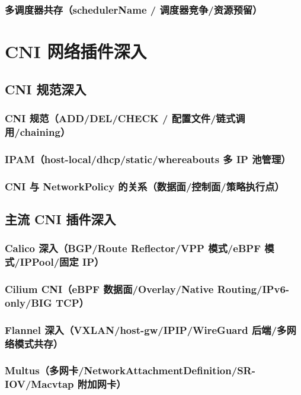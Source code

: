 \documentclass[12pt,UTF8]{ctexbook}
\begin{document}
    \subsection{多调度器共存（schedulerName / 调度器竞争/资源预留）}


\chapter{CNI 网络插件深入}
\label{chap:cni-deep}

  \section{CNI 规范深入}
    \subsection{CNI 规范（ADD/DEL/CHECK / 配置文件/链式调用/chaining）}
    \subsection{IPAM（host-local/dhcp/static/whereabouts 多 IP 池管理）}
    \subsection{CNI 与 NetworkPolicy 的关系（数据面/控制面/策略执行点）}

  \section{主流 CNI 插件深入}
    \subsection{Calico 深入（BGP/Route Reflector/VPP 模式/eBPF 模式/IPPool/固定 IP）}
    \subsection{Cilium CNI（eBPF 数据面/Overlay/Native Routing/IPv6-only/BIG TCP）}
    \subsection{Flannel 深入（VXLAN/host-gw/IPIP/WireGuard 后端/多网络模式共存）}
    \subsection{Multus（多网卡/NetworkAttachmentDefinition/SR-IOV/Macvtap 附加网卡）}
\end{document}
